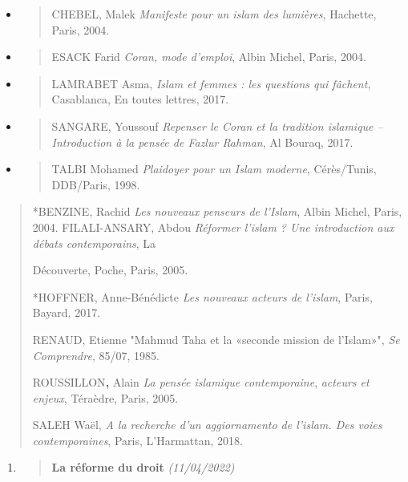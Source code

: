 \begin{itemize}
\item
  \begin{quote}
  CHEBEL, Malek \emph{Manifeste pour un islam des lumières}, Hachette,
  Paris, 2004.
  \end{quote}
\item
  \begin{quote}
  ESACK Farid \emph{Coran, mode d'emploi}, Albin Michel, Paris, 2004.
  \end{quote}
\item
  \begin{quote}
  LAMRABET Asma, \emph{Islam et femmes : les questions qui fâchent},
  Casablanca, En toutes lettres, 2017.
  \end{quote}
\item
  \begin{quote}
  SANGARE, Youssouf \emph{Repenser le Coran et la tradition islamique --
  Introduction à la pensée de Fazlur Rahman}, Al Bouraq, 2017.
  \end{quote}
\item
  \begin{quote}
  TALBI Mohamed \emph{Plaidoyer pour un Islam moderne}, Cérès/Tunis,
  DDB/Paris, 1998.
  \end{quote}
\end{itemize}

\begin{quote}
*BENZINE, Rachid \emph{Les nouveaux penseurs de l'Islam}, Albin Michel,
Paris, 2004. FILALI-ANSARY, Abdou \emph{Réformer l'islam ? Une
introduction aux débats contemporains}, La

Découverte, Poche, Paris, 2005.

*HOFFNER, Anne-Bénédicte \emph{Les nouveaux acteurs de l'islam}, Paris,
Bayard, 2017.

RENAUD, Etienne "Mahmud Taha et la «seconde mission de l'Islam»",
\emph{Se Comprendre}, 85/07, 1985.

ROUSSILLON\textbf{,} Alain \emph{La pensée islamique contemporaine},
\emph{acteurs et enjeux}, Téraèdre, Paris, 2005.

SALEH Waël, \emph{A la recherche d'un aggiornamento de l'islam. Des
voies contemporaines}, Paris, L'Harmattan, 2018.
\end{quote}

\begin{enumerate}
\def\labelenumi{\arabic{enumi}.}
\setcounter{enumi}{1}
\item
  \begin{quote}
  \textbf{{La réforme du droit}} \emph{(11/04/2022)}
  \end{quote}
\end{enumerate}

